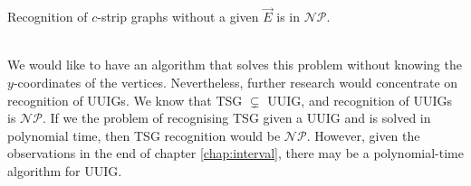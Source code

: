 \begin{obs}
  Recognition of $c$-strip graphs without a given $\overrightarrow{E}$ is in $\mathcal{NP}$.
\end{obs}

\\

We would like to have an algorithm that solves this problem without knowing the $y$-coordinates of the vertices. Nevertheless, further research would concentrate on recognition of UUIGs. We know that TSG $\subsetneq$ UUIG, and recognition of UUIGs is $\mathcal{NP}$. If we the problem of recognising TSG given a UUIG and is solved in polynomial time, then TSG recognition would be $\mathcal{NP}$. However, given the observations in the end of chapter \ref{chap:interval}, there may be a polynomial-time algorithm for UUIG.
